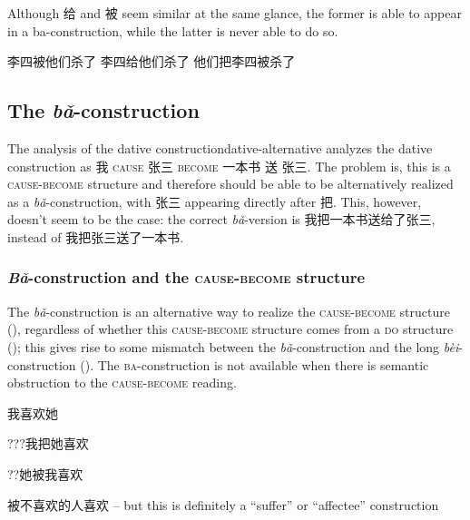 \documentclass[UTF8, a4paper, oneside, scheme=plain]{ctexrep}
\newcommand*{\citepage}[1]{p.~{#1}}
\newcommand*{\citepages}[1]{pp.~{#1}}
\newcommand{\corpus}[1]{\emph{#1}}
\newcommand*{\category}[1]{\textsc{#1}}
\begin{document}
Although 给 and 被 seem similar at the same glance, 
the former is able to appear in a ba-construction, 
while the latter is never able to do so. 

\begin{exe}
    \ex 李四被他们杀了
    \ex 李四给他们杀了
    \ex *他们把李四被杀了
\end{exe}


\subsection{The \corpus{bǎ}-construction}\label{sec:verb-phrase.object.ba}

\begin{infobox}{The analysis of the dative construction}{dative-alternative}
    \citet[\citepage{112}]{deng2010formal} analyzes the dative construction 
    as 我 \category{cause} 张三 \category{become} 一本书 送 张三.
    The problem is, this is a \category{cause}-\category{become} structure 
    and therefore should be able to be alternatively 
    realized as a \corpus{bǎ}-construction,
    with 张三 appearing directly after 把.
    This, however, doesn't seem to be the case: 
    the correct \corpus{bǎ}-version is 我把一本书送给了张三,
    instead of 我把张三送了一本书.
\end{infobox}

\subsubsection{\corpus{Bǎ}-construction and the \category{cause}-\category{become} structure}
\label{sec:verb-phrase.object.ba.cause-become}

The \corpus{bǎ}-construction
is an alternative way to realize 
the \category{cause}-\category{become} structure
(),
regardless of whether this \category{cause}-\category{become} structure 
comes from a \category{do} structure 
(\citealt[\citepages{98-99}]{deng2010formal});
this gives rise to some mismatch between the \corpus{bǎ}-construction
and the long \corpus{bèi}-construction 
().
The \category{ba}-construction is not available 
when there is semantic obstruction to the  
\category{cause}-\category{become} reading.


我喜欢她

???我把她喜欢

??她被我喜欢

被不喜欢的人喜欢 -- but this is definitely a ``suffer'' or ``affectee'' construction
\end{document}
